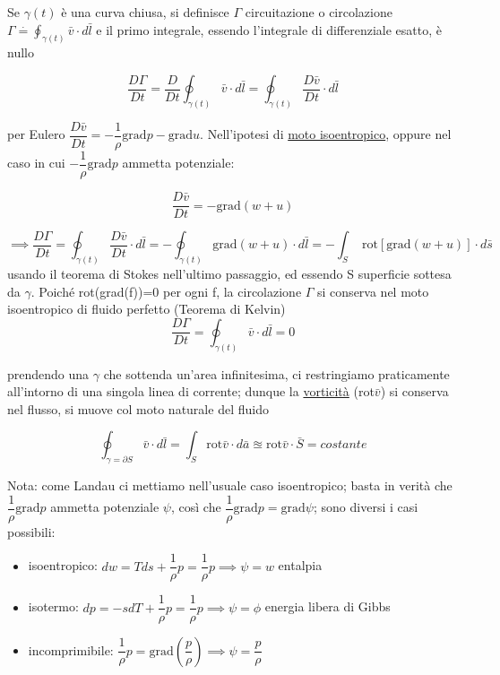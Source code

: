 \documentclass[a4paper,11pt]{report}
\newcommand{\defeq}{\overset{\cdot}{=}}
\newcommand{\vel}{\bar{v}}
\begin{document}
	Se $\gamma(t)$ è una curva chiusa, si definisce $\Gamma$ circuitazione o circolazione $\Gamma \defeq \oint_{\gamma(t)}\vel \cdot d\bar{l}$ e il primo integrale, essendo l'integrale di differenziale esatto, è nullo
	
	$$
	\dfrac{D \Gamma}{Dt} = \dfrac{D}{Dt}\oint_{\gamma(t)} \vel\cdot d\bar{l} = \oint_{\gamma(t)}\dfrac{D\vel}{Dt} \cdot d\bar{l}
	$$
	
	per Eulero $\dfrac{D\vel}{Dt} = -\dfrac{1}{\rho} \mathrm{grad}p - \mathrm{grad}u$.
	Nell'ipotesi di \underline{moto isoentropico}, oppure nel caso in cui  $ -\dfrac{1}{\rho}\mathrm{grad}p$ ammetta potenziale:
	
	$$
	\dfrac{D\vel}{Dt} = -\mathrm{grad}(w+u)
	$$
	
	$$
	\implies \dfrac{D\Gamma}{Dt} = \oint_{\gamma(t)}\dfrac{D\vel}{Dt} \cdot d\bar{l} = 
	-\oint_{\gamma(t)}\mathrm{grad}(w+u) \cdot d\bar{l} = 
	-\int_{S}\textrm{ rot}\left[\mathrm{grad}(w+u)\right]\cdot d\bar{s}
	$$
	usando il teorema di Stokes nell'ultimo passaggio, ed essendo S superficie sottesa da $\gamma$.
	Poiché rot(grad(f))=0 per ogni f, la circolazione $\Gamma$ si conserva nel moto isoentropico di fluido perfetto (Teorema di Kelvin)
	\begin{equation}
		\dfrac{D\Gamma}{Dt} = \oint_{\gamma(t)}\vel\cdot d\bar{l} = 0
	\end{equation}
	
	prendendo una $\gamma$ che sottenda un'area infinitesima, ci restringiamo praticamente all'intorno di una singola linea di corrente; dunque la \underline{vorticità} (rot$\vel$) si conserva nel flusso, si muove col moto naturale del fluido
	
	$$
	\oint_{\gamma = \partial S} \vel \cdot d\bar{l} = \int_{S}\mathrm{rot}\vel\cdot d\bar{a} \approxeq \mathrm{rot}\vel \cdot \bar{S} = costante
	$$
	
	Nota: come Landau ci mettiamo nell'usuale caso isoentropico; basta in verità che $\dfrac{1}{\rho}\mathrm{grad}p$ ammetta potenziale $\psi$, così che $\dfrac{1}{\rho}\mathrm{grad}p = \mathrm{grad}\psi$; sono diversi i casi possibili:
	\begin{itemize}
		\item isoentropico: $dw = Tds + \dfrac{1}{\rho}p = \dfrac{1}{\rho}p \implies \psi = w$ entalpia
		\item isotermo: $dp = -sdT + \dfrac{1}{\rho}p = \dfrac{1}{\rho}p \implies \psi=\phi$ energia libera di Gibbs
		\item incomprimibile: $\dfrac{1}{\rho}p = \mathrm{grad}\left(\dfrac{p}{\rho}\right) \implies \psi = \dfrac{p}{\rho}$
	\end{itemize}
	
\end{document}
